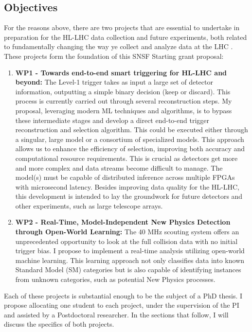 \documentclass[12pt]{iopart}
\begin{document}
\subsection{Objectives}
For the reasons above, there are two projects that are essential to undertake in preparation for the HL-LHC data collection and future experiments, both related to fundamentally changing the way ye collect and analyze data at the LHC . These projects form the foundation of this SNSF Starting grant proposal:

\begin{enumerate}
    \item \textbf{WP1 - Towards end-to-end smart triggering for HL-LHC and beyond:} The Level-1 trigger takes as input a large set of detector information, outputting a simple binary decision (keep or discard). This process is currently carried out through several reconstruction steps. My proposal, leveraging modern ML techniques and algorithms, is to bypass these intermediate stages and develop a direct end-to-end trigger reconstruction and selection algorithm. This could be executed either through a singular, large model or a consortium of specialized models. This approach allows us to enhance the efficiency of selection, improving both accuracy and computational resource requirements. This is crucial as detectors get more and more complex and data streams become difficult to manage. The model(s) must be capable of distributed inference across multiple FPGAs with microsecond latency. Besides improving data quality for the HL-LHC, this development is intended to lay the groundwork for future detectors and other experiments, such as large telescope arrays.
\item \textbf{WP2 - Real-Time, Model-Independent New Physics Detection through Open-World Learning:} The 40 MHz scouting system offers an unprecedented opportunity to look at the full collision data with no initial trigger bias. I propose to implement a real-time analysis utilizing open-world machine learning. This learning approach not only classifies data into known Standard Model (SM) categories but is also capable of identifying instances from unknown categories, such as potential New Physics processes.
\end{enumerate}

\noindent Each of these projects is substantial enough to be the subject of a PhD thesis. I propose allocating one student to each project, under the supervision of the PI and assisted by a Postdoctoral researcher. In the sections that follow, I will discuss the specifics of both projects.
\end{document}
